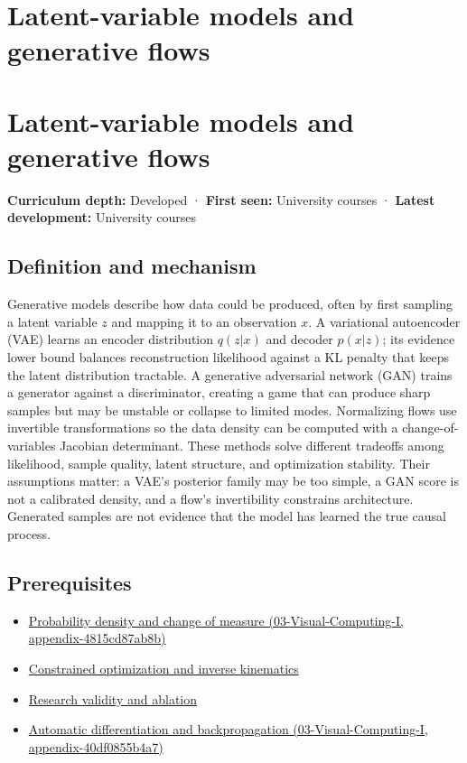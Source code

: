 \hypertarget{appendix-2c568f05ee34}{}
\section*{Latent-variable models and generative flows}
\section{Latent-variable models and generative flows}\label{appendix-2c568f05ee34-latent-variable-models-and-generative-flows}

\textbf{Curriculum depth:} Developed · \textbf{First seen:} University courses · \textbf{Latest development:} University courses

\subsection{Definition and mechanism}\label{appendix-2c568f05ee34-definition-and-mechanism}

Generative models describe how data could be produced, often by first sampling a latent variable \(z\) and mapping it to an observation \(x\). A variational autoencoder (VAE) learns an encoder distribution \(q(z|x)\) and decoder \(p(x|z)\); its evidence lower bound balances reconstruction likelihood against a KL penalty that keeps the latent distribution tractable. A generative adversarial network (GAN) trains a generator against a discriminator, creating a game that can produce sharp samples but may be unstable or collapse to limited modes. Normalizing flows use invertible transformations so the data density can be computed with a change-of-variables Jacobian determinant. These methods solve different tradeoffs among likelihood, sample quality, latent structure, and optimization stability. Their assumptions matter: a VAE's posterior family may be too simple, a GAN score is not a calibrated density, and a flow's invertibility constrains architecture. Generated samples are not evidence that the model has learned the true causal process.

\subsection{Prerequisites}\label{appendix-2c568f05ee34-prerequisites}

\begin{itemize}
\tightlist
\item
  \href{../03-Visual-Computing-I/main.pdf\#nameddest=appendix-4815cd87ab8b}{Probability density and change of measure (03-Visual-Computing-I, appendix-4815cd87ab8b)}
\item
  \hyperref[appendix-29f4bea4c2bb]{Constrained optimization and inverse kinematics}
\item
  \hyperref[appendix-65788587ef78]{Research validity and ablation}
\item
  \href{../03-Visual-Computing-I/main.pdf\#nameddest=appendix-40df0855b4a7}{Automatic differentiation and backpropagation (03-Visual-Computing-I, appendix-40df0855b4a7)}
\end{itemize}

